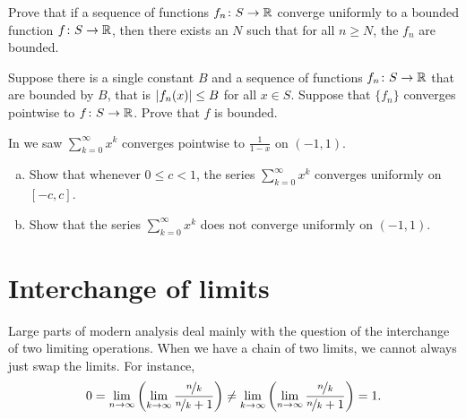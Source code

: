 \begin{exercise}
Prove that
if a sequence of functions $f_n \colon S \to {\mathbb{R}}$
converge uniformly to a bounded function $f \colon S \to {\mathbb{R}}$,
then there exists an $N$ such that for all $n \geq N$, the $f_n$
are bounded.
\end{exercise}

\begin{exercise}
Suppose there is a single constant $B$ and
a sequence of functions
$f_n \colon S \to {\mathbb{R}}$ that are bounded by $B$,
that is $\left\lvert {f_n(x)} \right\rvert \leq B$ for all $x \in S$.
Suppose that $\{ f_n \}$ converges pointwise
to $f \colon S \to {\mathbb{R}}$.
Prove that $f$ is bounded.
\end{exercise}

\begin{exercise}
In  we saw
$\sum_{k=0}^\infty x^k$ converges pointwise to $\frac{1}{1-x}$ on
$(-1,1)$.
\begin{enumerate}[a)]
\item
Show that whenever $0 \leq c < 1$, the series
$\sum_{k=0}^\infty x^k$ converges uniformly on $[-c,c]$.
\item
Show that the series $\sum_{k=0}^\infty x^k$ does not converge uniformly
on $(-1,1)$.
\end{enumerate}
\end{exercise}


\sectionnewpage
\section{Interchange of limits}
\label{sec:liminter}


Large parts of modern analysis deal mainly with the question of the
interchange of two limiting operations.  When
we have a chain of two limits, we cannot always just swap the limits.
For instance,
\begin{equation*}
0 = 
\lim_{n\to\infty}
\left(
\lim_{k\to\infty}
\frac{\nicefrac{n}{k}}{\nicefrac{n}{k} + 1}
\right)
\not=
\lim_{k\to\infty}
\left(
\lim_{n\to\infty}
\frac{\nicefrac{n}{k}}{\nicefrac{n}{k} + 1}
\right)
= 1 .
\end{equation*}

